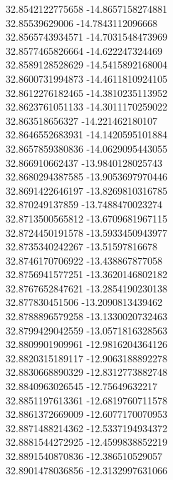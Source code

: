 {32.8542122775658	-14.8657158274881\\
32.85539629006	-14.7843112096668\\
32.8565743934571	-14.7031548473969\\
32.8577465826664	-14.622247324469\\
32.8589128528629	-14.5415892168004\\
32.8600731994873	-14.4611810924105\\
32.8612276182465	-14.3810235113952\\
32.8623761051133	-14.3011170259022\\
32.863518656327	-14.221462180107\\
32.8646552683931	-14.1420595101884\\
32.8657859380836	-14.0629095443055\\
32.866910662437	-13.9840128025743\\
32.8680294387585	-13.9053697970446\\
32.8691422646197	-13.8269810316785\\
32.870249137859	-13.7488470023274\\
32.8713500565812	-13.6709681967115\\
32.8724450191578	-13.5933450943977\\
32.8735340242267	-13.51597816678\\
32.8746170706922	-13.438867877058\\
32.8756941577251	-13.3620146802182\\
32.8767652847621	-13.2854190230138\\
32.877830451506	-13.2090813439462\\
32.8788896579258	-13.1330020732463\\
32.8799429042559	-13.0571816328563\\
32.8809901909961	-12.9816204364126\\
32.8820315189117	-12.9063188892278\\
32.8830668890329	-12.8312773882748\\
32.8840963026545	-12.75649632217\\
32.8851197613361	-12.6819760711578\\
32.8861372669009	-12.6077170070953\\
32.8871488214362	-12.5337194934372\\
32.8881544272925	-12.4599838852219\\
32.8891540870836	-12.386510529057\\
32.8901478036856	-12.3132997631066\\
}
